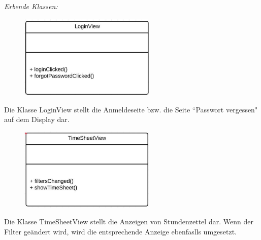         \begin{itemize}
                \emph{Erbende Klassen:}
                \begin{itemize}


                                        \begin{figure}[htb]
                    \centering
                    \includegraphics[width=6.5cm]{Diagramms/class/singleclass/ViewLogin.pdf}
                    \end{figure}
                    \newline
                    Die Klasse LoginView stellt die Anmeldeseite bzw. die Seite “Passwort vergessen" auf dem Display dar.
                    \begin{itemize}
                    \end{itemize}

                                                            \begin{figure}[htb]
                    \centering
                    \includegraphics[width=6.5cm]{Diagramms/class/singleclass/ViewTS.pdf}
                    \end{figure}
                    \newline
                    Die Klasse TimeSheetView stellt die Anzeigen von Stundenzettel dar. Wenn der Filter geändert wird, wird die entsprechende Anzeige ebenfaslls umgesetzt.
                    \begin{itemize}
                    \end{itemize}


\end{itemize}
\end{itemize}
